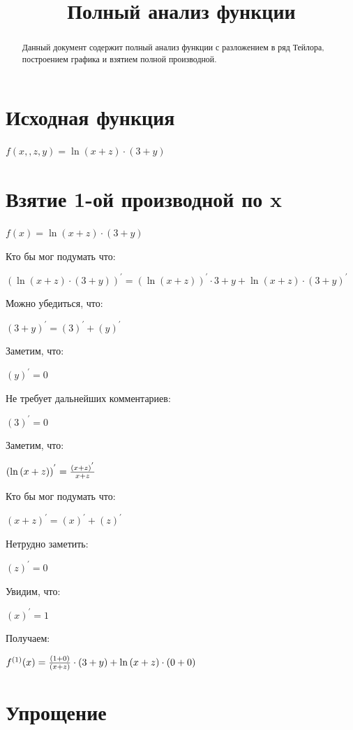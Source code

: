 \documentclass[a4paper,12pt]{article}
\title{Полный анализ функции}
\begin{document}
\maketitle
\renewcommand{\abstractname}{Введение}\begin{abstract}Данный документ содержит полный анализ функции с разложением в ряд Тейлора, построением графика и взятием полной производной.\end{abstract}
\section*{Исходная функция}

$f(x, , z, y) = {{\ln{({x} + {z})}} \cdot {({3} + {y})}}$

\section{Взятие 1-ой производной по x}

$ f(x) = {{\ln{({x} + {z})}} \cdot {({3} + {y})}}$

Кто бы мог подумать что:

${({{\ln{({x} + {z})}} \cdot {({3} + {y})}})}^{'} = {({\ln{({x} + {z})}})}^{'}\cdot {{3} + {y}} + {\ln{({x} + {z})}}\cdot {({{3} + {y}})}^{'}$

Можно убедиться, что:

${({{3} + {y}})}^{'} = {({3})}^{'} + {({y})}^{'}$

Заметим, что:

${({y})}^{'} = 0$

Не требует дальнейших комментариев:

${({3})}^{'} = 0$

Заметим, что:

${({\ln{({x} + {z})}})}^{'} = {{{({{x} + {z}})}^{'} } \over {{{x} + {z}}}}$

Кто бы мог подумать что:

${({{x} + {z}})}^{'} = {({x})}^{'} + {({z})}^{'}$

Нетрудно заметить:

${({z})}^{'} = 0$

Увидим, что:

${({x})}^{'} = 1$

Получаем:

$ f^{(1)}(x) = {{{{({1} + {0})} \over {({x} + {z})}} \cdot {({3} + {y})}} + {{\ln{({x} + {z})}} \cdot {({0} + {0})}}}$

\section{Упрощение}
\end{document}
